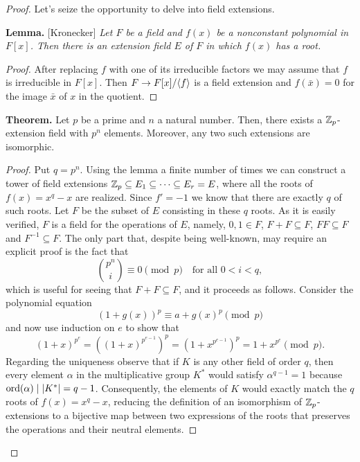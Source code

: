 \begin{proof} Let's seize the opportunity to delve into field extensions.

\medskip

\textbf{Lemma.} [Kronecker] \textit{Let\/ $F$ be a field and\/ $f(x)$ be a nonconstant polynomial in\/ $F[x]$. Then there is an extension field\/ $E$ of\/ $F$ in which\/ $f(x)$ has a root.}

\begin{proof} After replacing $f$ with one of its irreducible factors we may assume that $f$ is irreducible in $F[x]$. Then $F\to F[x]/\langle f\rangle$ is a field extension and $f(\bar x)=0$ for the image $\bar x$ of $x$ in the quotient.  \end{proof}

\medskip

\textbf{Theorem.} Let $p$ be a prime and $n$ a natural number. Then, there exists a $\mathbb{Z}_p$-extension field with $p^n$ elements. Moreover, any two such extensions are isomorphic.

\begin{proof}
    Put $q=p^n$. Using the lemma a finite number of times we can construct a tower of field extensions $\mathbb{Z}_p\subseteq E_1\subseteq\cdots\subseteq E_r=E$, where all the roots of $f(x)=x^q-x$ are realized. Since $f'=-1$ we know that there are exactly $q$ of such roots. Let $F$ be the subset of $E$ consisting in these $q$ roots. As it is easily verified, $F$ is a field for the operations of $E$, namely, $0,1\in F$, $F+F\subseteq F$, $FF\subseteq F$ and $F^{-1}\subseteq F$. The only part that, despite being well-known, may require an explicit proof is the fact that
    $$
        \binom{p^n}{i}\equiv0\pmod p\quad\text{for all }0<i<q,
    $$
     which is useful for seeing that $F+F\subseteq F$, and it proceeds as follows. Consider the polynomial equation
    $$
        (1 + g(x))^p\equiv a + g(x)^p\pmod p
    $$
    and now use induction on $e$ to show that
    $$
        (1+x)^{p^e} = ((1+x)^{p^{e-1}})^p = (1+x^{p^{e-1}})^p=1 + x^{p^e} \pmod p.
    $$
    Regarding the uniqueness observe that if $K$ is any other field of order $q$, then every element $\alpha$ in the multiplicative group $K^*$ would satisfy $\alpha^{q-1}=1$ because ${\rm ord}(\alpha)\mid|K^*|=q-1$. Consequently, the elements of $K$ would exactly match the $q$ roots of $f(x)=x^q-x$, reducing the definition of an isomorphism of $\mathbb{Z}_p$-extensions to a bijective map between two expressions of the roots that preserves the operations and their neutral elements.
\end{proof}



\end{proof}

